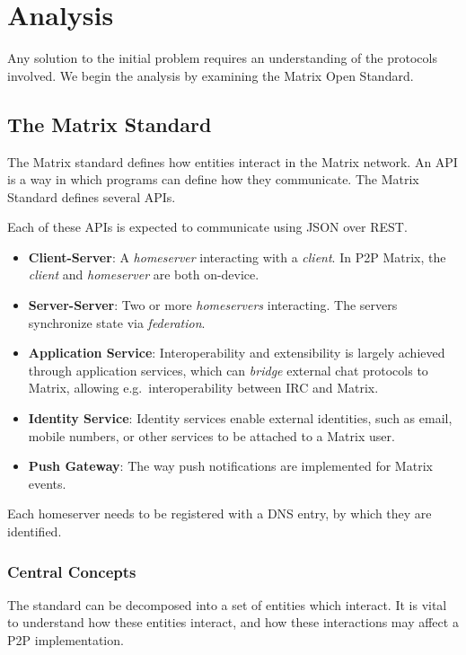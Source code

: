 \chapter{Analysis}
Any solution to the initial problem requires an understanding of the protocols involved.
We begin the analysis by examining the Matrix Open Standard.

\section{The Matrix Standard}
The Matrix standard defines how entities interact in the Matrix network.
An \ac{API} is a way in which programs can define how they communicate.
The Matrix Standard defines several \ac{API}s.

Each of these \ac{API}s is expected to communicate using \ac{JSON} over \ac{REST}.
\begin{itemize}
      \item \textbf{Client-Server}:
            A \textit{homeserver} interacting with a \textit{client}.
            In \ac{P2P} Matrix, the \textit{client} and \textit{homeserver} are both on-device.
      \item \textbf{Server-Server}:
            Two or more \textit{homeservers} interacting.
            The servers synchronize state via \textit{federation}.
      \item \textbf{Application Service}:
            Interoperability and extensibility is largely achieved through application services, which can \textit{bridge} external chat protocols to Matrix, allowing e.g.~interoperability between \ac{IRC} and Matrix.
      \item \textbf{Identity Service}:
            Identity services enable external identities, such as email, mobile numbers, or other services to be attached to a Matrix user.
      \item \textbf{Push Gateway}:
            The way push notifications are implemented for Matrix events.
\end{itemize}

Each homeserver needs to be registered with a \ac{DNS} entry, by which they are identified.

\subsection{Central Concepts}
The standard can be decomposed into a set of entities which interact.
It is vital to understand how these entities interact, and how these interactions may affect a \ac{P2P} implementation.


